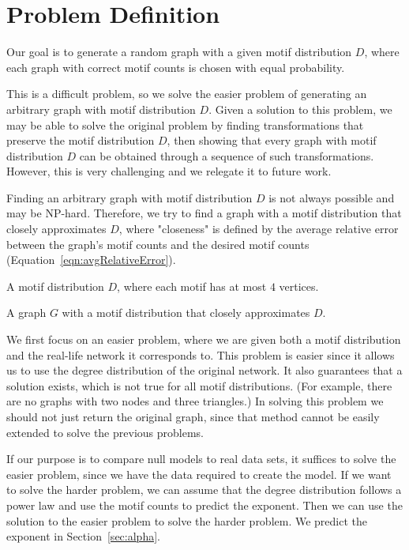 \section{Problem Definition}
\label{sec:problem}
Our goal is to generate a random graph with a given motif distribution $D$,
where each graph with correct motif counts is chosen with equal probability.

This is a difficult problem, so we solve the easier problem of generating
an arbitrary graph with motif distribution $D$.  Given a solution to this
problem, we may be able to solve the original problem by finding 
transformations that preserve the motif distribution $D$, then showing
that every graph with motif distribution $D$ can be obtained through a
sequence of such transformations.  However, this is very challenging and we
relegate it to future work.

Finding an arbitrary graph with motif distribution $D$ is not always
possible and may be NP-hard.  Therefore, we try to find a graph with a
motif distribution that closely approximates $D$, where "closeness" is
defined by the average relative error between the graph's motif counts and
the desired motif counts (Equation~\ref{eqn:avgRelativeError}).

\begin{framed}
 A motif distribution $D$, where each motif has at most $4$ vertices.

 A graph $G$ with a motif distribution that closely
approximates $D$.
\end{framed}

We first focus on an easier problem, where we are given both a motif
distribution and the real-life network it corresponds to.  This problem is
easier since it allows us to use the degree distribution of the original
network.  It also guarantees that a solution exists, which is not true for
all motif distributions.  (For example, there are no graphs with two nodes
and three triangles.)  In solving this problem we should not just return
the original graph, since that method cannot be easily extended to solve
the previous problems.

If our purpose is to compare null models to real data sets, it suffices to
solve the easier problem, since we have the data required to create the
model.  If we want to solve the harder problem, we can assume that the
degree distribution follows a power law and use the motif counts to predict
the exponent.  Then we can use the solution to the easier problem to solve
the harder problem.  We predict the exponent in Section~\ref{sec:alpha}.


